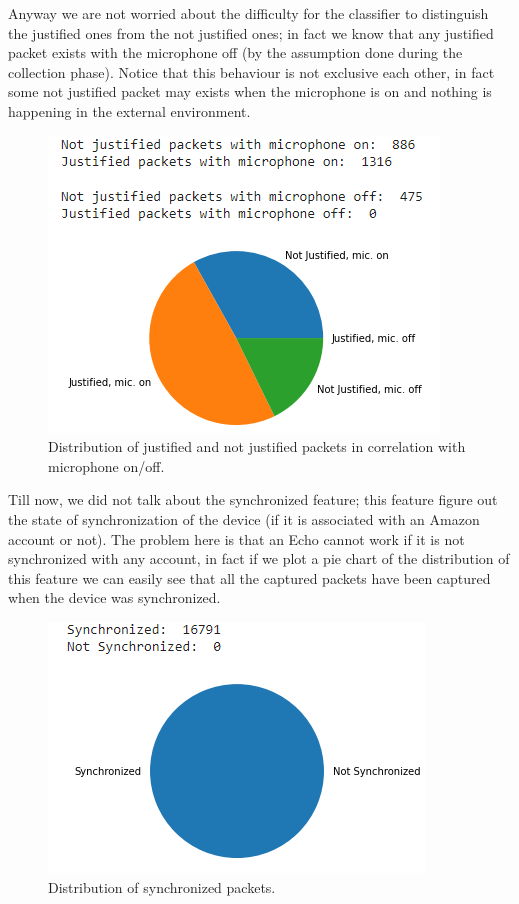 \documentclass[sigconf]{acmart}
\begin{document}
Anyway we are not worried about the difficulty for the classifier to distinguish the justified ones from the not justified ones; in fact we know that any justified packet exists with the microphone off (by the assumption done during the collection phase). Notice that this behaviour is not exclusive each other, in fact some not justified packet may exists when the microphone is on and nothing is happening in the external environment.
	\begin{figure}[h!]
            \includegraphics[width=0.8\linewidth]{img/justified_not_justified.png}
            \caption{Distribution of justified and not justified packets in correlation with microphone on/off.}
            \label{fig:justified_not_justified}
        \end{figure}

Till now, we did not talk about the synchronized feature; this feature figure out the state of synchronization of the device (if it is associated with an Amazon account or not). The problem here is that an Echo cannot work if it is not synchronized with any account, in fact if we plot a pie chart of the distribution of this feature we can easily see that all the captured packets have been captured when the device was synchronized. 
\begin{figure}[h!]
            \includegraphics[width=0.8\linewidth]{img/syn_not_syn.png}
            \caption{Distribution of synchronized packets.}
            \label{fig:syn_not_syn}
        \end{figure}
\end{document}
